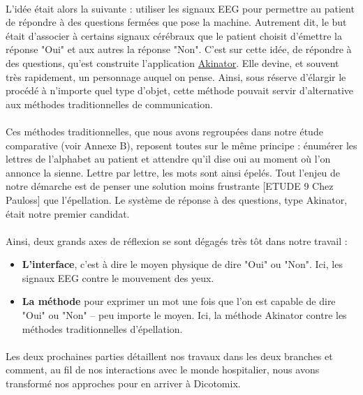 \documentclass[11pt,a4paper]{article}
\theoremstyle{plain}
\theoremstyle{definition}
\begin{document}
\paragraph{} L'idée était alors la suivante : utiliser les signaux EEG pour permettre au patient de répondre à des questions fermées que pose la machine.
Autrement dit, le but était d'associer à certains signaux cérébraux que le patient choisit d'émettre la réponse "Oui" et aux autres la réponse "Non". 
C'est sur cette idée, de répondre à des questions, qu'est construite l'application \href{http://fr.akinator.com/}{Akinator}. Elle devine, et souvent très rapidement, 
un personnage auquel on pense. Ainsi, sous réserve d'élargir le procédé à n'importe quel type d'objet, cette méthode pouvait servir d'alternative aux méthodes traditionnelles de communication.

\paragraph{} Ces méthodes traditionnelles, que nous avons regroupées dans notre étude comparative (voir Annexe B), reposent toutes sur le même principe : énumérer les
lettres de l'alphabet au patient et attendre qu'il dise oui au moment où l'on annonce la sienne. Lettre par lettre, les mots sont ainsi épelés. Tout l'enjeu de notre démarche est de penser une solution moins frustrante [ETUDE 9 Chez Pauloss] que l'épellation. Le système de réponse à des questions, type Akinator, était notre premier candidat.

\paragraph{} Ainsi, deux grands axes de réflexion se sont dégagés très tôt dans notre travail :
\begin{itemize}
\item \textbf{L'interface}, c'est à dire le moyen physique de dire "Oui" ou "Non". Ici, les signaux EEG contre le mouvement des yeux.
\item \textbf{La méthode} pour exprimer un mot une fois que l'on est capable de dire "Oui" ou "Non" -- peu importe le moyen. Ici, la méthode Akinator contre 
les méthodes traditionnelles d'épellation.
\end{itemize}

\paragraph{} Les deux prochaines parties détaillent nos travaux dans les deux branches et comment, au fil de nos interactions avec le monde hospitalier, nous avons transformé nos approches pour en arriver à Dicotomix.
\end{document}
